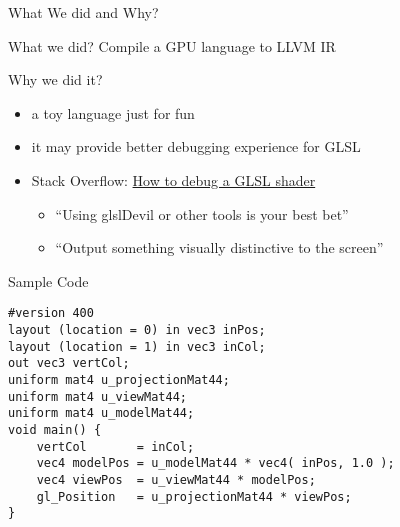 \begin{frame}{What We did and Why?}
    \begin{block}{What we did?}
        Compile a GPU language to LLVM IR
    \end{block}

    \begin{block}{Why we did it?}
        \begin{itemize}
            \item a toy language just for fun
            \item it may provide better debugging experience for GLSL
            \item Stack Overflow: \href{https://stackoverflow.com/questions/2508818/how-to-debug-a-glsl-shader}{How to debug a GLSL shader}
            \begin{itemize}
                \item ``Using glslDevil or other tools is your best bet''
                \item ``Output something visually distinctive to the screen''    
            \end{itemize}
        \end{itemize}
    \end{block}

\end{frame}

\begin{frame}[fragile]{Sample Code}
   \begin{lstlisting}
#version 400
layout (location = 0) in vec3 inPos;
layout (location = 1) in vec3 inCol;
out vec3 vertCol;
uniform mat4 u_projectionMat44;
uniform mat4 u_viewMat44;
uniform mat4 u_modelMat44;
void main() {
    vertCol       = inCol;
    vec4 modelPos = u_modelMat44 * vec4( inPos, 1.0 );
    vec4 viewPos  = u_viewMat44 * modelPos;
    gl_Position   = u_projectionMat44 * viewPos;
}
   \end{lstlisting}
\end{frame}
